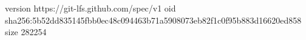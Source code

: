version https://git-lfs.github.com/spec/v1
oid sha256:5b52dd835145fbb0ec48c094463b71a5908073eb82f1c0f95b883d16620ed858
size 282254
